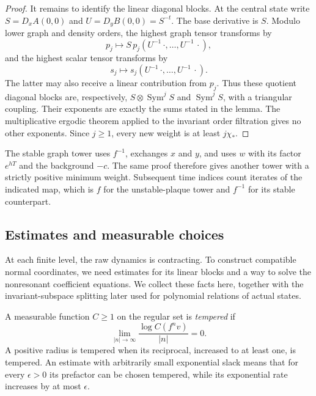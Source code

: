\begin{proof}
It remains to identify the linear diagonal blocks.  At the central
state write $S=D_xA(0,0)$ and $U=D_yB(0,0)=S^{-t}$.
The base derivative is $S$.  Modulo lower graph and density orders,
the highest graph tensor transforms by
\[
 p_j\longmapsto S\,p_j(U^{-1}\,\cdot,\ldots,U^{-1}\,\cdot),
\]
and the highest scalar tensor transforms by
\[
 s_j\longmapsto s_j(U^{-1}\,\cdot,\ldots,U^{-1}\,\cdot).
\]
The latter may also receive a linear contribution from $p_j$.
Thus these quotient diagonal blocks are, respectively,
$S\otimes\operatorname{Sym}^jS$ and
$\operatorname{Sym}^jS$, with a triangular coupling.  Their exponents
are exactly the sums stated in the lemma.  The multiplicative
ergodic theorem applied to the invariant order filtration gives
no other exponents.
Since $j\geq1$, every new weight is at least $j\chi_*$.
\end{proof}

The stable graph tower uses $f^{-1}$, exchanges $x$ and $y$, and uses
$w$ with its factor $e^{hT}$ and the background $-c$.  The same proof
therefore gives another tower with a strictly positive minimum
weight.  Subsequent time indices count iterates of the indicated
map, which is $f$ for the unstable-plaque tower and $f^{-1}$ for its
stable counterpart.

\subsection{Estimates and measurable choices}

At each finite level, the raw dynamics is contracting. To construct
compatible normal coordinates, we need estimates for its linear blocks
and a way to solve the nonresonant coefficient equations.
We collect these facts here, together with the invariant-subspace
splitting later used for polynomial relations of actual states.

\begin{definition}\label{nf:tempered}
A measurable function $C\geq1$ on the regular set is \emph{tempered} if
\[
 \lim_{|n|\to\infty}\frac{\log C(f^n v)}{|n|}=0.
\]
A positive radius is tempered when its reciprocal, increased to at
least one, is tempered.  An estimate with arbitrarily small exponential
slack means that for every $\epsilon>0$ its prefactor can be chosen
tempered, while its exponential rate increases by at most $\epsilon$.
\end{definition}

